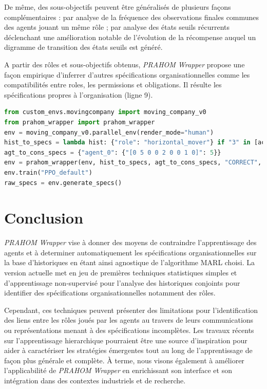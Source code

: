 \documentclass[demonstration]{jfsma}
\begin{document}
De même, des sous-objectifs peuvent être généralisés de plusieurs façons complémentaires : par analyse de la fréquence des observations finales communes des agents jouant un même rôle ; par analyse des états seuils récurrents déclenchant une amélioration notable de l'évolution de la récompense auquel un digramme de transition des états seuils est généré.

A partir des rôles et sous-objectifs obtenus, \emph{PRAHOM Wrapper} propose une façon empirique d'inferrer d'autres spécifications organisationnelles comme les compatibilités entre roles, les permissions et obligations. Il résulte les spécifications propres à l'organisation (ligne 9).

\begin{lstlisting}[language=Python, caption={Utilisation synthétique de \emph{PRAHOM Wrapper} pour \emph{Moving Company}}, label={lst:wrapper_mc}]
from custom_envs.movingcompany import moving_company_v0
from prahom_wrapper import prahom_wrapper
env = moving_company_v0.parallel_env(render_mode="human")
hist_to_specs = lambda hist: {"role": "horizontal_mover"} if "3" in [act for obs, act in hist.items()] else None
agt_to_cons_specs = {"agent_0": {"[0 5 0 0 2 0 0 1 0]": 5}}
env = prahom_wrapper(env, hist_to_specs, agt_to_cons_specs, "CORRECT", ["sequence_clustering"], ["role", "goals"], ["dendogram", "PCA"])
env.train("PPO_default")
raw_specs = env.generate_specs()
\end{lstlisting}

\section{Conclusion}

\emph{PRAHOM Wrapper} vise à donner des moyens de contraindre l'apprentissage des agents et à determiner automatiquement les spécifications organisationnelles sur la base d'historiques en étant ainsi agnostique de l'algorithme MARL choisi.
La version actuelle met en jeu de premières techniques statistiques simples et d'apprentissage non-supervisé pour l'analyse des historiques conjoints pour identifier des spécifications organisationnelles notamment des rôles.

Cependant, ces techniques peuvent présenter des limitations pour l'identification des liens entre les rôles joués par les agents au travers de leurs communications ou représentations menant à des spécifications incomplètes.
Les travaux récents sur l'apprentissage hierarchique pourraient être une source d'inspiration pour aider à caractériser les stratégies émergentes tout au long de l’apprentissage de façon plus générale et complète.
À terme, nous visons également à améliorer l'applicabilité de \emph{PRAHOM Wrapper} en enrichissant son interface et son intégration dans des contextes industriels et de recherche.
\end{document}
